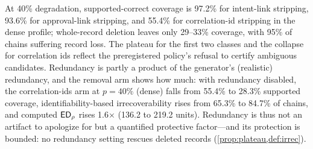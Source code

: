 \begin{finding}
\label{fnd:redundancy}
At 40\% degradation, supported-correct coverage is 97.2\% for intent-link
stripping, 93.6\% for approval-link stripping, and 55.4\% for correlation-id
stripping in the dense profile; whole-record deletion leaves only 29--33\%
coverage, with 95\% of chains suffering record loss. The plateau for the first
two classes and the collapse for correlation ids reflect the preregistered policy's
refusal to certify ambiguous candidates. Redundancy is
partly a product of the generator's (realistic) redundancy, and the removal arm
shows how much: with redundancy disabled, the correlation-ids arm at
$p{=}40\%$ (dense) falls from 55.4\% to 28.3\% supported coverage, identifiability-based
irrecoverability rises from 65.3\% to 84.7\% of chains, and computed $\mathsf{ED}_\rho$
rises 1.6$\times$ (136.2 to 219.2 units). Redundancy is thus not an artifact to
apologize for but a quantified protective factor---and its protection is
bounded: no redundancy setting rescues deleted records
(\cref{prop:plateau,def:irrec}).
\end{finding}

